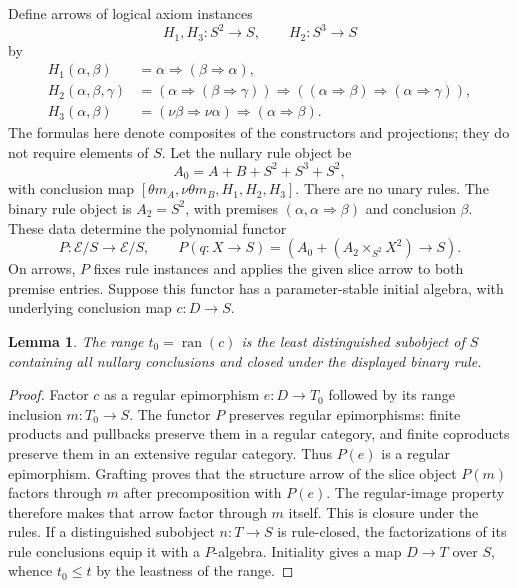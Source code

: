 \documentclass[11pt]{article}
\newtheorem{lemma}[theorem]{Lemma}
\theoremstyle{definition}
\theoremstyle{remark}
\newcommand{\ran}{\operatorname{ran}}
\begin{document}
Define arrows of logical axiom instances
\[
 H_1,H_3:S^2\longrightarrow S,\qquad H_2:S^3\longrightarrow S
\]
by
\begin{align*}
 H_1(\alpha,\beta)&=\alpha\Rightarrow(\beta\Rightarrow\alpha),\\
 H_2(\alpha,\beta,\gamma)
   &=(\alpha\Rightarrow(\beta\Rightarrow\gamma))
      \Rightarrow((\alpha\Rightarrow\beta)
                    \Rightarrow(\alpha\Rightarrow\gamma)),\\
 H_3(\alpha,\beta)&=(\nu\beta\Rightarrow\nu\alpha)
                         \Rightarrow(\alpha\Rightarrow\beta).
\end{align*}
The formulas here denote composites of the constructors and projections;
they do not require elements of $S$. Let the nullary rule object be
\[
 A_0=A+B+S^2+S^3+S^2,
\]
with conclusion map $[\theta m_A,\nu\theta m_B,H_1,H_2,H_3]$.
There are no unary rules. The binary rule object is $A_2=S^2$, with
premises $(\alpha,\alpha\Rightarrow\beta)$ and conclusion $\beta$.
These data determine the polynomial functor
\[
 P:\mathscr E/S\longrightarrow\mathscr E/S,
 \qquad
 P(q:X\to S)=
 \left(A_0+(A_2\times_{S^2}X^2)\longrightarrow S\right).
\]
On arrows, $P$ fixes rule instances and applies the given slice arrow
to both premise entries. Suppose this functor has a parameter-stable
initial algebra, with underlying conclusion map $c:D\to S$.

\begin{lemma}\label{gen:theorem-image}
The range $t_0=\ran(c)$ is the least distinguished subobject of $S$
containing all nullary conclusions and closed under the displayed binary
rule.
\end{lemma}
\begin{proof}
Factor $c$ as a regular epimorphism $e:D\to T_0$ followed by its range
inclusion $m:T_0\to S$. The functor $P$ preserves regular epimorphisms:
finite products and pullbacks preserve them in a regular category, and
finite coproducts preserve them in an extensive regular category. Thus
$P(e)$ is a regular epimorphism. Grafting proves that the structure
arrow of the slice object $P(m)$ factors through $m$ after
precomposition with $P(e)$.
The regular-image property therefore makes that arrow factor
through $m$ itself. This is closure under the rules. If a distinguished
subobject $n:T\to S$ is rule-closed, the factorizations of its rule
conclusions equip it with a $P$-algebra. Initiality gives a map
$D\to T$ over $S$, whence $t_0\le t$ by the leastness of the range.
\end{proof}
\end{document}
